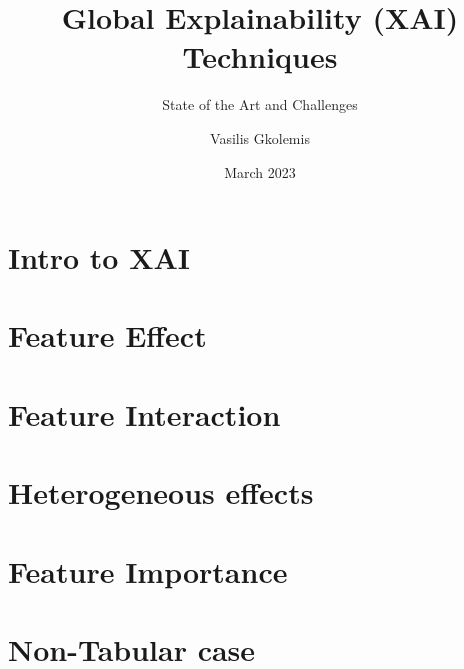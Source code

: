 \documentclass{beamer}
\title[FUB-Presentation]{Global Explainability (XAI) Techniques}
\subtitle{State of the Art and Challenges}
\author[Gkolemis, Vasilis] %
{Vasilis Gkolemis\inst{!}\inst{*}}
\institute[HUA] %
{
  \inst{!} ATHENA Research and Innovation Center \and
  \inst{*} Harokopio University of Athens
}
\date{March 2023}
\begin{document}
\frame{\titlepage}

\section{Intro to XAI}


\section{Feature Effect}
%

\section{Feature Interaction}
%

\section{Heterogeneous effects}
%

\section{Feature Importance}
% 

\section{Non-Tabular case}
\end{document}
